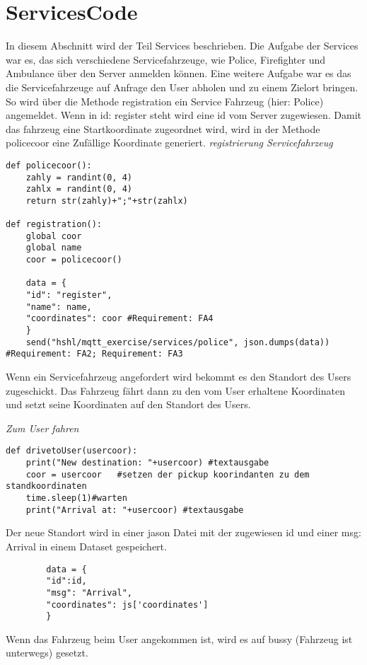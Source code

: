 \section{ServicesCode}
In diesem Abschnitt wird der Teil Services beschrieben. 
Die Aufgabe der Services war es, das sich verschiedene Servicefahrzeuge, wie Police, Firefighter und Ambulance über den Server anmelden können. Eine weitere Aufgabe war es das die Servicefahrzeuge auf Anfrage den User abholen und zu einem Zielort bringen.
So wird über die Methode registration ein Service Fahrzeug (hier: Police) angemeldet. Wenn in id: register steht wird eine id vom Server zugewiesen.
Damit das fahrzeug eine Startkoordinate zugeordnet wird, wird in der Methode policecoor eine Zufällige Koordinate generiert. 
\newline
\textit{registrierung Servicefahrzeug}
\begin{lstlisting}
def policecoor(): 
    zahly = randint(0, 4)
    zahlx = randint(0, 4)
    return str(zahly)+";"+str(zahlx)

def registration():
    global coor
    global name
    coor = policecoor()

    data = {
    "id": "register",
    "name": name,
    "coordinates": coor #Requirement: FA4
    }
    send("hshl/mqtt_exercise/services/police", json.dumps(data)) #Requirement: FA2; Requirement: FA3
\end{lstlisting}

Wenn ein Servicefahrzeug angefordert wird bekommt es den Standort des Users zugeschickt. 
Das Fahrzeug fährt dann zu den vom User erhaltene Koordinaten und setzt seine Koordinaten auf den Standort des Users.

\newline
\textit{Zum User fahren}
\begin{lstlisting}
def drivetoUser(usercoor):
    print("New destination: "+usercoor) #textausgabe
    coor = usercoor   #setzen der pickup koorindanten zu dem standkoordinaten
    time.sleep(1)#warten
    print("Arrival at: "+usercoor) #textausgabe
\end{lstlisting}



\newline
Der neue Standort wird in einer jason Datei mit der zugewiesen id und einer msg: Arrival in einem Dataset gespeichert.
\begin{lstlisting}
        data = {
        "id":id,
        "msg": "Arrival",
        "coordinates": js['coordinates']
        }
\end{lstlisting}
Wenn das Fahrzeug beim User angekommen ist, wird es auf bussy (Fahrzeug ist unterwegs) gesetzt.


